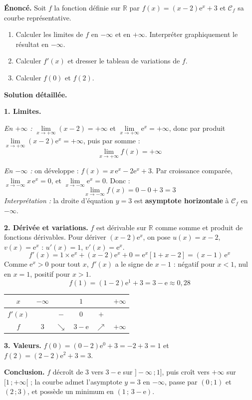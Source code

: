 \documentclass[11pt]{article}
\begin{document}
\begin{exoresolu}
\textbf{Énoncé.} Soit $f$ la fonction définie sur $\mathbb{R}$ par $f(x) = (x - 2)\mathrm{e}^{x} + 3$ et $\mathcal{C}_f$ sa courbe représentative.
\begin{enumerate}
\item Calculer les limites de $f$ en $-\infty$ et en $+\infty$. Interpréter graphiquement le résultat en $-\infty$.
\item Calculer $f'(x)$ et dresser le tableau de variations de $f$.
\item Calculer $f(0)$ et $f(2)$.
\end{enumerate}
\tcblower
\textbf{Solution détaillée.}

\textbf{1. Limites.}

\emph{En $+\infty$ :} $\lim\limits_{x \to +\infty} (x-2) = +\infty$ et $\lim\limits_{x \to +\infty} \mathrm{e}^{x} = +\infty$, donc par produit $\lim\limits_{x \to +\infty} (x-2)\mathrm{e}^{x} = +\infty$, puis par somme :
\[ \lim_{x \to +\infty} f(x) = +\infty \]

\emph{En $-\infty$ :} on développe : $f(x) = x\,\mathrm{e}^{x} - 2\mathrm{e}^{x} + 3$. Par croissance comparée, $\lim\limits_{x \to -\infty} x\,\mathrm{e}^{x} = 0$, et $\lim\limits_{x \to -\infty} \mathrm{e}^{x} = 0$. Donc :
\[ \lim_{x \to -\infty} f(x) = 0 - 0 + 3 = 3 \]
\emph{Interprétation :} la droite d'équation $y = 3$ est \textbf{asymptote horizontale} à $\mathcal{C}_f$ en $-\infty$.

\textbf{2. Dérivée et variations.} $f$ est dérivable sur $\mathbb{R}$ comme somme et produit de fonctions dérivables. Pour dériver $(x-2)\mathrm{e}^x$, on pose $u(x) = x-2$, $v(x) = \mathrm{e}^x$ : $u'(x) = 1$, $v'(x) = \mathrm{e}^x$.
\[ f'(x) = 1 \times \mathrm{e}^{x} + (x-2)\mathrm{e}^{x} + 0 = \mathrm{e}^{x}\left[1 + x - 2\right] = (x-1)\,\mathrm{e}^{x} \]
Comme $\mathrm{e}^{x} > 0$ pour tout $x$, $f'(x)$ a le signe de $x - 1$ : négatif pour $x < 1$, nul en $x = 1$, positif pour $x > 1$.
\[ f(1) = (1-2)\mathrm{e}^{1} + 3 = 3 - \mathrm{e} \approx 0{,}28 \]

\begin{center}
\begin{tabular}{|c|ccccc|}\hline
$x$ & $-\infty$ & & $1$ & & $+\infty$ \\ \hline
$f'(x)$ & & $-$ & $0$ & $+$ & \\ \hline
$f$ & $3$ & $\searrow$ & $3-\mathrm{e}$ & $\nearrow$ & $+\infty$ \\ \hline
\end{tabular}
\end{center}

\textbf{3. Valeurs.} $f(0) = (0-2)\mathrm{e}^{0} + 3 = -2 + 3 = 1$ et $f(2) = (2-2)\mathrm{e}^{2} + 3 = 3$.

\textbf{Conclusion.} $f$ décroît de $3$ vers $3-\mathrm{e}$ sur $]-\infty\,;1]$, puis croît vers $+\infty$ sur $[1\,;+\infty[$ ; la courbe admet l'asymptote $y = 3$ en $-\infty$, passe par $(0\,;1)$ et $(2\,;3)$, et possède un minimum en $(1\,;\,3-\mathrm{e})$.
\end{exoresolu}
\end{document}
